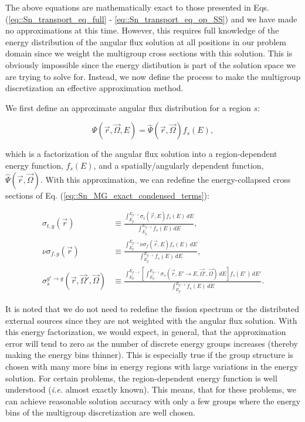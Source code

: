 The above equations are mathematically exact to those presented in Eqs. (\ref{eq::Sn_transport_eq_full} - \ref{eq::Sn_transport_eq_op_SS}) and we have made no approximations at this time. However, this requires full knowledge of the energy distribution of the angular flux solution at all positions in our problem domain since we weight the multigroup cross sections with this solution. This is obviously impossible since the energy distibution is part of the solution space we are trying to solve for. Instead, we now define the process to make the multigroup discretization an effective approximation method.

We first define an approximate angular flux distribution for a region $s$:

\begin{equation}
\label{eq::Sn_MG_flux_approx}
\Psi (\vec{r},\vec{\Omega}, E) =  \hat{\Psi} (\vec{r},\vec{\Omega}) f_{s} (E) ,
\end{equation}

\noindent which is a factorization of the angular flux solution into a region-dependent energy function, $f_s (E)$, and a spatially/angularly dependent function, $\hat{\Psi} (\vec{r},\vec{\Omega})$. With this approximation, we can redefine the energy-collapsed cross sections of Eq. (\ref{eq::Sn_MG_exact_condensed_terms}):

\begin{equation}
\label{eq::MG_approx_condensed_terms}
\begin{aligned}
\sigma_{t,g} (\vec{r}) & \equiv \frac{\int_{E_{g}}^{E_{g-1}} \sigma_{t} (\vec{r},E) f_{s} (E) \, dE}{\int_{E_{g}}^{E_{g-1}} f_{s} (E) \, dE} ,\\
\nu\sigma_{f,g} (\vec{r}) & \equiv \frac{\int_{E_{g}}^{E_{g-1}} \nu\sigma_{f} (\vec{r},E)  f_{s} (E) \, dE }{\int_{E_{g}}^{E_{g-1}} f_{s} (E) \, dE}, \\
\sigma_{s}^{g' \rightarrow g} (\vec{r},\vec{\Omega}' , \vec{\Omega} ) & \equiv \frac{\int_{E_{g'}}^{E_{g'-1}} \left[ \int_{E_{g}}^{E_{g-1}} \sigma_s (\vec{r},E' \rightarrow E,\vec{\Omega}' , \vec{\Omega} ) \, dE \right] f_{s} (E')\, dE' }{\int_{E_{g}}^{E_{g-1}}  f_{s} (E) \, dE} .
\end{aligned}
\end{equation}

\noindent It is noted that we do not need to redefine the fission spectrum or the distributed external sources since they are not weighted with the angular flux solution. With this energy factorization, we would expect, in general, that the approximation error will tend to zero as the number of discrete energy groups increases (thereby making the energy bins thinner). This is especially true if the group structure is chosen with many more bins in energy regions with large variations in the energy solution. For certain problems, the region-dependent energy function is well understood ({\em i.e.} almost exactly known). This means, that for these problems, we can achieve reasonable solution accuracy with only a few groups where the energy bins of the multigroup discretization are well chosen.


